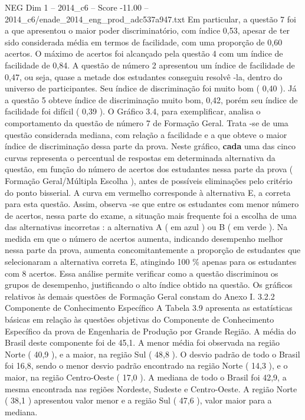 \begin{textsample}{NEG Dim 1 – 2014\_c6 – Score -11.00 – 2014\_c6/enade\_2014\_eng\_prod\_adc537a947.txt}
Em particular, a questão 7 foi a que apresentou o maior poder discriminatório, com índice 0,53, apesar de ter sido considerada média em termos de facilidade, com uma proporção de 0,60 acertos.
O máximo de acertos foi alcançado pela questão 4 com um índice de facilidade de 0,84.
A questão de número 2 apresentou um índice de facilidade de 0,47, ou seja, quase a metade dos estudantes conseguiu resolvê -la, dentro do universo de participantes.
Seu índice de discriminação foi muito bom ( 0,40 ).
Já a questão 5 obteve índice de discriminação muito bom, 0,42, porém seu índice de facilidade foi difícil ( 0,39 ).
O Gráfico 3.4, para exemplificar, analisa o comportamento da questão de número 7 de Formação Geral.
Trata -se de uma questão considerada mediana, com relação a facilidade e a que obteve o maior índice de discriminação dessa parte da prova.
Neste gráfico, \textbf{cada} uma das cinco curvas representa o percentual de respostas em determinada alternativa da questão, em função do número de acertos dos estudantes nessa parte da prova ( Formação Geral/Múltipla Escolha ), antes de possíveis eliminações pelo critério do ponto bisserial.
A curva em vermelho corresponde à alternativa E, a correta para esta questão.
Assim, observa -se que entre os estudantes com menor número de acertos, nessa parte do exame, a situação mais frequente foi a escolha de uma das alternativas incorretas : a alternativa A ( em azul ) ou B ( em verde ).
Na medida em que o número de acertos aumenta, indicando desempenho melhor nessa parte da prova, aumenta concomitantemente a proporção de estudantes que selecionaram a alternativa correta E, atingindo 100 \% apenas para os estudantes com 8 acertos.
Essa análise permite verificar como a questão discriminou os grupos de desempenho, justificando o alto índice obtido na questão.
Os gráficos relativos às demais questões de Formação Geral constam do Anexo I. 3.2.2 Componente de Conhecimento Específico A Tabela 3.9 apresenta as estatísticas básicas em relação às questões objetivas do Componente de Conhecimento Específico da prova de Engenharia de Produção por Grande Região.
A média do Brasil deste componente foi de 45,1.
A menor média foi observada na região Norte ( 40,9 ), e a maior, na região Sul ( 48,8 ).
O desvio padrão de todo o Brasil foi 16,8, sendo o menor desvio padrão encontrado na região Norte ( 14,3 ), e o maior, na região Centro-Oeste ( 17,0 ).
A mediana de todo o Brasil foi 42,9, a mesma encontrada nas regiões Nordeste, Sudeste e Centro-Oeste.
A região Norte ( 38,1 ) apresentou valor menor e a região Sul ( 47,6 ), valor maior para a mediana.

\end{textsample}
